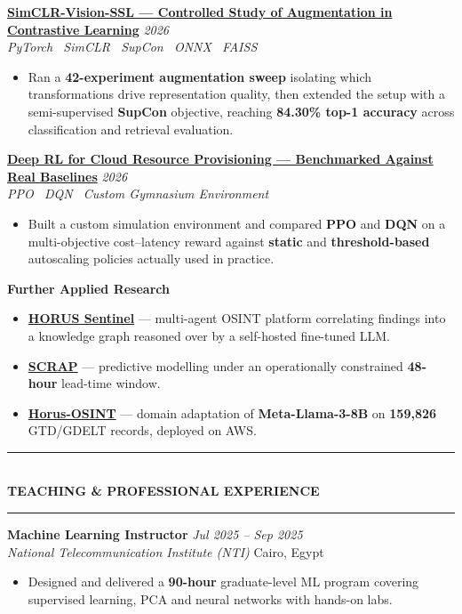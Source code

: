 \documentclass[10pt, a4paper]{article}
\newcommand{\cvsection}[1]{%
  \vspace{3pt}%
  {\color{navy}\rule{\linewidth}{1.1pt}}\\[0.5pt]%
  {\color{navy}\bfseries\fontsize{9.5}{11}\selectfont\uppercase{#1}}\\[-4pt]%
  {\color{teal}\rule{\linewidth}{0.6pt}}%
  \vspace{2pt}%
}
\newcommand{\cventry}[4]{%
  \vspace{2.5pt}%
  \textbf{\color{darkgray}#1} \hfill {\color{midgray}\textit{#3}}\\[-1.5pt]%
  {\color{teal}\textit{#2}} \hfill {\color{midgray}#4}%
}
\newcommand{\cvproject}[3]{%
  \vspace{2.5pt}%
  {\bfseries\color{navy}#1} \hfill {\color{midgray}\textit{#3}}\\[-1.5pt]%
  {\color{teal}\textit{#2}}%
}
\newcommand{\cvmini}[2]{\item {\bfseries\color{navy}#1} --- #2}
\newenvironment{cvitems}{%
  \begin{itemize}[leftmargin=11pt, itemsep=0.5pt, parsep=0pt, topsep=1pt,
                  label={\textcolor{teal}{$\bullet$}}]
}{%
  \end{itemize}%
}
\begin{document}
\cvproject{\href{https://github.com/MahmoudAlyosify/SimCLR-Vision-SSL}{SimCLR-Vision-SSL --- Controlled Study of Augmentation in Contrastive Learning}}
          {PyTorch \textperiodcentered\ SimCLR \textperiodcentered\ SupCon \textperiodcentered\ ONNX \textperiodcentered\ FAISS}
          {2026}
\begin{cvitems}
  \item Ran a \textbf{42-experiment augmentation sweep} isolating which transformations drive representation quality, then extended the setup with a semi-supervised \textbf{SupCon} objective, reaching \textbf{84.30\% top-1 accuracy} across classification and retrieval evaluation.
\end{cvitems}

\cvproject{\href{https://github.com/MahmoudAlyosify/RL-Cloud-Autoscaler}{Deep RL for Cloud Resource Provisioning --- Benchmarked Against Real Baselines}}
          {PPO \textperiodcentered\ DQN \textperiodcentered\ Custom Gymnasium Environment}
          {2026}
\begin{cvitems}
  \item Built a custom simulation environment and compared \textbf{PPO} and \textbf{DQN} on a multi-objective cost--latency reward against \textbf{static} and \textbf{threshold-based} autoscaling policies actually used in practice.
\end{cvitems}

\vspace{3pt}
{\bfseries\color{navy}Further Applied Research}
\begin{cvitems}
  \cvmini{\href{https://github.com/MahmoudAlyosify/horus-sentinel}{HORUS Sentinel}}{multi-agent OSINT platform correlating findings into a knowledge graph reasoned over by a self-hosted fine-tuned LLM.}
  \cvmini{\href{https://github.com/MahmoudAlyosify/SCRAP-Satellite-Collision-Risk-Assessment-and-Prediction}{SCRAP}}{predictive modelling under an operationally constrained \textbf{48-hour} lead-time window.}
  \cvmini{\href{https://github.com/MahmoudAlyosify/Horus-OSINT}{Horus-OSINT}}{domain adaptation of \textbf{Meta-Llama-3-8B} on \textbf{159,826} GTD/GDELT records, deployed on AWS.}
\end{cvitems}

\cvsection{Teaching \& Professional Experience}

\cventry{Machine Learning Instructor}{National Telecommunication Institute (NTI)}
        {Jul 2025 -- Sep 2025}{Cairo, Egypt}
\begin{cvitems}
  \item Designed and delivered a \textbf{90-hour} graduate-level ML program covering supervised learning, PCA and neural networks with hands-on labs.
\end{cvitems}
\end{document}
